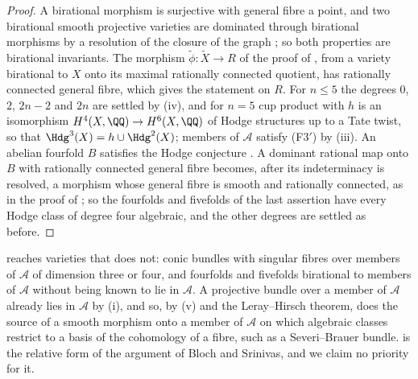 \begin{proof}
A birational morphism is surjective with general fibre a point, and two
birational smooth projective varieties are dominated through birational
morphisms by a resolution of the closure of the graph \cite{Hir64}; so both
properties are birational invariants. The morphism
$\widetilde\phi\colon\widetilde X\to R$ of the proof of
, from a variety birational to $X$ onto its maximal
rationally connected quotient, has rationally connected general fibre,
which gives the statement on $R$. For $n\le5$ the degrees $0$, $2$, $2n-2$
and $2n$ are settled by (iv), and for $n=5$ cup product
with $h$ is an isomorphism $H^{4}(X,\QQ)\to H^{6}(X,\QQ)$ of Hodge structures
up to a Tate twist, so that $\Hdg^{3}(X)=h\cup\Hdg^{2}(X)$; members of
$\mathcal{A}$ satisfy \textup{(F3$'$)} by (iii). An
abelian fourfold $B$ satisfies the Hodge conjecture \cite{Mar25a,Mar25b}. A
dominant rational map onto $B$ with rationally connected general fibre
becomes, after its indeterminacy is resolved, a morphism whose general fibre
is smooth and rationally connected, as in the proof of
; so the fourfolds and fivefolds of the last
assertion have every Hodge class of degree four algebraic, and the other
degrees are settled as before.
\end{proof}

 reaches varieties that 
does not: conic bundles with singular fibres over members of $\mathcal{A}$ of
dimension three or four, and fourfolds and fivefolds birational to members
of $\mathcal{A}$ without being known to lie in $\mathcal{A}$. A projective
bundle over a member of $\mathcal{A}$ already lies in $\mathcal{A}$ by
(i), and so, by (v) and the
Leray--Hirsch theorem, does the source of a smooth morphism onto a member of
$\mathcal{A}$ on which algebraic classes restrict to a basis of the
cohomology of a fibre, such as a Severi--Brauer bundle.
 is the relative form of the argument of Bloch
and Srinivas, and we claim no priority for it.

